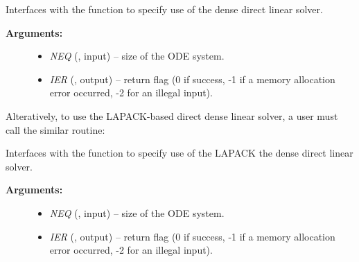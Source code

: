 \documentclass[letterpaper,10pt,english]{sphinxmanual}
\begin{document}
\begin{fulllineitems}
\label{f_interface/Usage:f/_/FARKDENSE}
Interfaces with the {\hyperref[c_interface/User_callable:c.ARKDense]{\emph{}}} function to
specify use of the dense direct linear solver.
\begin{description}
\item[{\textbf{Arguments:}}] \leavevmode\begin{itemize}
\item {} 
\emph{NEQ} (, input) -- size of the ODE system.

\item {} 
\emph{IER} (, output) -- return flag (0 if success, -1 if a memory allocation
error occurred, -2 for an illegal input).

\end{itemize}

\end{description}

\end{fulllineitems}


Alteratively, to use the LAPACK-based direct dense linear solver, a
user must call the similar {\hyperref[f_interface/Usage:f/_/FARKLAPACKDENSE]{\emph{}}} routine:

\begin{fulllineitems}
\label{f_interface/Usage:f/_/FARKLAPACKDENSE}
Interfaces with the {\hyperref[c_interface/User_callable:c.ARKLapackDense]{\emph{}}} function
to specify use of the LAPACK the dense direct linear solver.
\begin{description}
\item[{\textbf{Arguments:}}] \leavevmode\begin{itemize}
\item {} 
\emph{NEQ} (, input) -- size of the ODE system.

\item {} 
\emph{IER} (, output) -- return flag (0 if success, -1 if a memory allocation
error occurred, -2 for an illegal input).

\end{itemize}

\end{description}

\end{fulllineitems}
\end{document}
